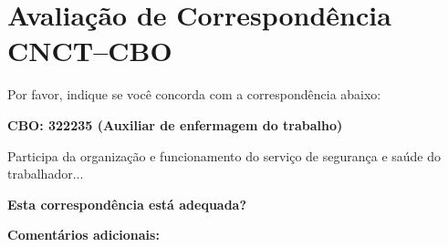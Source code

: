 \documentclass{article}
\begin{document}
	
	\section*{Avaliação de Correspondência CNCT–CBO}
	
	Por favor, indique se você concorda com a correspondência abaixo:
	
	\vspace{1em}
	
	\textbf{CBO: 322235 (Auxiliar de enfermagem do trabalho)}
	
	\vspace{0.5em}
	
	Participa da organização e funcionamento do serviço de segurança e saúde do trabalhador...
	
	\vspace{1em}
	
	\begin{Form}
		
		\textbf{Esta correspondência está adequada?} \\
		
		
		
		\vspace{1em}
		
		\textbf{Comentários adicionais:} \\[0.5em]
		\TextField[multiline=true, backgroundcolor=0.9 0.9 1, bordercolor=red, width=\linewidth, height=4cm]{}
		
	\end{Form}
	
\end{document}
